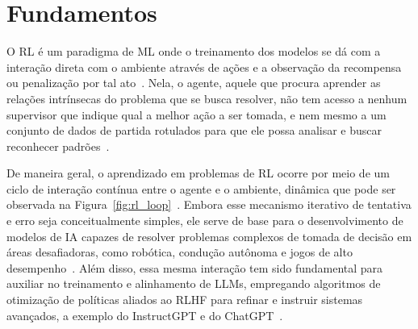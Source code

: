 \section*{Fundamentos}

O \gls{RL} é um paradigma de \gls{ML} onde o treinamento dos modelos se dá com a interação direta com o ambiente através de ações e a observação da recompensa ou penalização por tal ato~\cite{sutton2018}. Nela, o agente, aquele que procura aprender as relações intrínsecas do problema que se busca resolver, não tem acesso a nenhum supervisor que indique qual a melhor ação a ser tomada, e nem mesmo a um conjunto de dados de partida rotulados para que ele possa analisar e buscar reconhecer padrões~\cite{hu2024, sutton2018}.

De maneira geral, o aprendizado em problemas de \gls{RL} ocorre por meio de um ciclo de interação contínua entre o agente e o ambiente, dinâmica que pode ser observada na Figura~\ref{fig:rl_loop}~\cite{hu2024, sutton2018}. Embora esse mecanismo iterativo de tentativa e erro seja conceitualmente simples, ele serve de base para o desenvolvimento de modelos de \gls{IA} capazes de resolver problemas complexos de tomada de decisão em áreas desafiadoras, como robótica, condução autônoma e jogos de alto desempenho~\cite{hu2024}. Além disso, essa mesma interação tem sido fundamental para auxiliar no treinamento e alinhamento de \glspl{LLM}, empregando algoritmos de otimização de políticas aliados ao \gls{RLHF} para refinar e instruir sistemas avançados, a exemplo do InstructGPT e do ChatGPT~\cite{ouyang2022, hu2024}.

